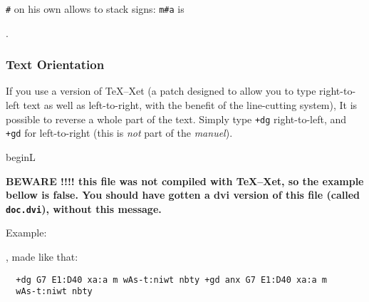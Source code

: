 \documentclass[final]{article}
\begin{document}
\verb/#/ on his own allows to stack signs: 
\verb/m#a/ is 
\begin{hieroglyph}{\leavevmode {}}\end{hieroglyph}.

\subsubsection{Text Orientation}

If you use a version of TeX--Xet (a patch designed to allow you to
type right-to-left text as well as left-to-right, with the benefit of
the line-cutting system), It is possible to reverse a whole part of
the text. Simply type \verb/+dg/ right-to-left, and \verb/+gd/ for
left-to-right (this is {\em not\/} part of the {\em manuel\/}).

\expandafter\ifx\csname beginL\endcsname\relax %
\def\beginL{\relax}             %
\def\beginR{\relax} \def\endR{\relax} \def\endL{\relax}

{\bf BEWARE !!!! this file was not compiled with TeX--Xet, so the
  example bellow is false. You should have gotten a dvi version of
  this file (called \verb/doc.dvi/), without this message.} \fi

Example:
\begin{hieroglyph}{\leavevmode \rightleft\HwordSpace
{}\HwordSpace
{}\HwordSpace
{}\HwordSpace
{}\HwordSpace
{}\HinterSignsSpace
{}\HwordSpace
{}\HwordSpace
\leftright\HwordSpace
{}\HwordSpace
{}\HwordSpace
{}\HwordSpace
{}\HwordSpace
{}\HwordSpace
{}\HinterSignsSpace
{}\HwordSpace
{}}\end{hieroglyph}, made like that: 
\begin{verbatim}
  +dg G7 E1:D40 xa:a m wAs-t:niwt nbty +gd anx G7 E1:D40 xa:a m
  wAs-t:niwt nbty
\end{verbatim}
\end{document}
